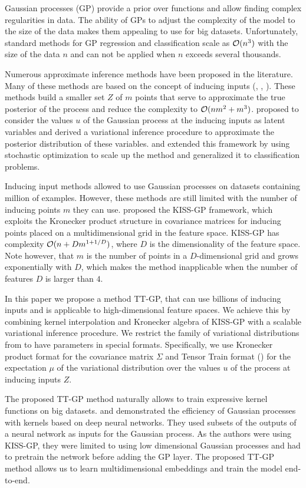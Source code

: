 Gaussian processes (GP) provide a prior over functions and allow finding complex
regularities in data. The ability of GPs to adjust the complexity of the model
to the size of the data makes them appealing to use for big datasets.
Unfortunately, standard methods for GP regression and classification scale as
$\mathcal{O}(n^3)$ with the size of the data $n$ and can not be applied when $n$
exceeds several thousands.

Numerous approximate inference methods have been proposed in the literature. Many
of these methods are based on the concept of inducing inputs (\citet{candela2005},
\citet{snelson2006}, \citet{williams2000}). These methods build a smaller set
$Z$ of $m$ points that serve to approximate the true posterior of the process
and reduce the complexity to $\mathcal{O}(nm^2 + m^3)$. \citet{titsias2009} proposed
to consider the values $u$ of the Gaussian process at the inducing inputs
as latent variables and derived a variational inference procedure to approximate
the posterior distribution of these variables. \citet{hensman2013} and
\citet{hensman2015} extended this framework by using stochastic optimization to
scale up the method and generalized it to classification problems.

Inducing input methods allowed to use Gaussian processes on datasets containing
million of examples. However, these methods are still limited with the number
of inducing points $m$ they can use. \citet{wilson2015} proposed the KISS-GP
framework, which exploits the Kronecker product structure in covariance matrices
for inducing points placed on a multidimensional grid in the feature space.
KISS-GP has complexity $\mathcal{O}(n + D m^{1 + 1/D})$, where $D$ is the dimensionality
of the feature space. Note however, that $m$ is the number of points in a
$D$-dimensional grid and grows exponentially with $D$, which makes the method
inapplicable when the number of features $D$ is larger than $4$.

In this paper we propose a method TT-GP, that can use billions of inducing
inputs and is applicable to high-dimensional feature spaces. We achieve
this by combining kernel interpolation and Kronecker algebra of KISS-GP with
a scalable variational inference procedure. We restrict the family of
variational distributions from \citet{hensman2013} to have parameters in
special formats. Specifically, we use Kronecker product format for the
covariance matrix $\Sigma$ and Tensor Train format (\citet{oseledets2011}) for the
expectation $\mu$ of the variational distribution over the values $u$ of the
process at inducing inputs $Z$.

The proposed TT-GP method naturally allows to train expressive kernel functions
on big datasets. \citet{wilson2016deep} and \citet{wilson2016stochastic}
demonstrated the efficiency of Gaussian processes with kernels based on deep
neural networks. They used subsets of the outputs of a neural network as
inputs for the Gaussian process. As the authors were using KISS-GP, they
were limited to using low dimensional Gaussian processes and had to
pretrain the network before adding the GP layer. The proposed TT-GP method
allows us to learn multidimensional embeddings and train the model end-to-end.
